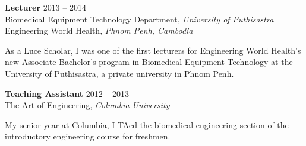 \documentclass[10pt]{article}
\newenvironment{innerlist}[1][\enskip\textbullet]%
        {\begin{itemize}[#1,leftmargin=*,parsep=0pt,itemsep=0pt,topsep=0pt,partopsep=0pt]}
        {\end{itemize}}
\begin{document}


\textbf{Lecturer} \hfill {2013 -- 2014} \\
Biomedical Equipment Technology Department, \textit{University of Puthisastra} \\
Engineering World Health, \textit{Phnom Penh, Cambodia} 
  \vspace{0.08in}

As a Luce Scholar, I was one of the first lecturers for Engineering World Health's new Associate Bachelor’s program in Biomedical Equipment Technology at the University of Puthisastra, a private university in Phnom Penh.  \\


\vspace{.15in}

\textbf{Teaching Assistant} \hfill {2012 -- 2013} \\
The Art of Engineering, \textit{Columbia University} 
  \vspace{0.08in}

My senior year at Columbia, I TAed the biomedical engineering section of the introductory engineering course for freshmen. \\
\end{document}
